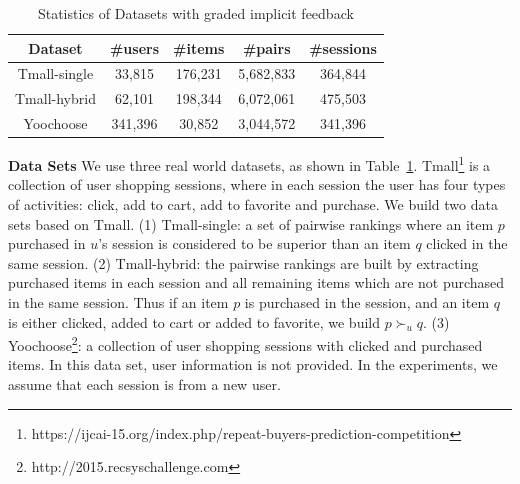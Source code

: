 \documentclass[letterpaper]{article} %
\begin{document}
\begin{table}[htp]
\tiny
\caption{Statistics of Datasets with graded implicit feedback}
\begin{center}
\begin{tabular}{|c|c|c|c|c|}
\hline
Dataset & \#users & \#items & \#pairs & \#sessions \\\hline
Tmall-single &33,815 &176,231 &5,682,833 &364,844 \\\hline
Tmall-hybrid &62,101 &198,344 &6,072,061 &475,503 \\\hline
Yoochoose &341,396 &30,852 &3,044,572 &341,396 \\\hline
\end{tabular}
\end{center}
\vspace*{-10pt}
\label{tab:idata}
\end{table}%

\textbf{Data Sets}  We use three real world datasets, as shown in Table~\ref{tab:idata}. Tmall\footnote{https://ijcai-15.org/index.php/repeat-buyers-prediction-competition} is a collection of user shopping sessions, where in each session the user has four types of activities: click, add to cart, add to favorite and purchase. We build two data sets based on Tmall. (1) Tmall-single: a set of pairwise rankings where an item $p$ purchased in $u$'s session is considered to be superior than an item $q$ clicked in the same session. (2) Tmall-hybrid: the pairwise rankings are built by extracting purchased items in each session and all remaining items which are not purchased in the same session. Thus if an item $p$ is purchased in the session, and an item $q$ is either clicked, added to cart or added to favorite, we build $p\succ_u q$. (3) Yoochoose\footnote{http://2015.recsyschallenge.com}: a collection of user shopping sessions with clicked and purchased items. In this data set, user information is not provided. In the experiments, we assume that each session is from a new user. 
\end{document}
